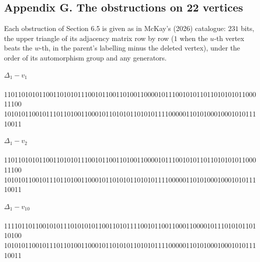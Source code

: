\documentclass[
]{article}
\begin{document}

\setcounter{table}{0}\setcounter{figure}{0}

\subsection{Appendix G. The obstructions on 22
vertices}\label{appendix-g.-the-obstructions-on-22-vertices}

Each obstruction of Section 6.5 is given as in McKay's (2026) catalogue:
\(231\) bits, the upper triangle of its adjacency matrix row by row
(\(1\) when the \(u\)-th vertex beats the \(w\)-th, in the parent's
labelling minus the deleted vertex), under the order of its automorphism
group and any generators.

\noindent

\begin{minipage}{\linewidth}
\textbf{$\Delta_1 - v_{1}$}\\[2pt]
{\small{}\\
11011010101100110101011100101100110100110000101110010101101101010101100011100\\
10101011001011101101001100010110101011010101111000001101010001000101011110011}
\end{minipage}
\medskip

\noindent

\begin{minipage}{\linewidth}
\textbf{$\Delta_1 - v_{2}$}\\[2pt]
{\small{}\\
11011010101100110101011100101100110100110000101110010101101101010101100011100\\
10101011001011101101001100010110101011010101111000001101010001000101011110011}
\end{minipage}
\medskip

\noindent

\begin{minipage}{\linewidth}
\textbf{$\Delta_1 - v_{10}$}\\[2pt]
{\small{}\\
11110110110010101110101010110011010111100101100110001100001011101010110110100\\
10101011001011101101001100010110101011010101111000001101010001000101011110011}
\end{minipage}
\medskip
\end{document}
